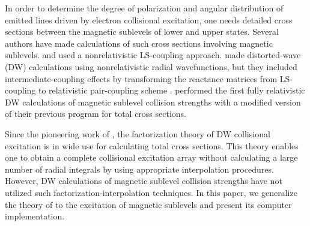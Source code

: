 In order to determine the degree of polarization and angular distribution of
emitted lines driven by electron collisional excitation, one needs detailed
cross sections between the magnetic sublevels of lower and upper states. Several
authors have made calculations of such cross sections involving magnetic
sublevels. \citet{mitroy:1988a} and \citet{mitroy:1988b} used a nonrelativistic
LS-coupling approach. \citet{inal87} made distorted-wave (DW) calculations using
nonrelativistic radial wavefunctions, but they included intermediate-coupling
effects by transforming the reactance matrices from LS-coupling to relativistic
pair-coupling scheme \citep{eissner72, saraph:1978a}. \citet{zhang90} performed
the first fully relativistic DW calculations of magnetic sublevel collision
strengths with a modified version of their previous program for total cross
sections.

Since the pioneering work of \citet{barshalom:1988a}, the factorization theory
of DW collisional excitation is in wide use for calculating total cross
sections. This theory enables one to obtain a complete collisional excitation
array without calculating a large number of radial integrals by using
appropriate interpolation procedures. However, DW calculations of magnetic
sublevel collision strengths have not utilized such factorization-interpolation
techniques. In this paper, we generalize the theory of \citet{barshalom:1988a}
to the excitation of magnetic sublevels and present its computer implementation.

